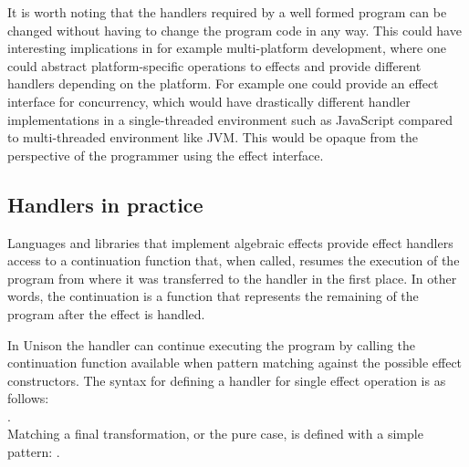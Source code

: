 It is worth noting that the handlers required by a well formed program can be changed without having to change the program code in any way. This could have interesting implications in for example multi-platform development, where one could abstract platform-specific operations to effects and provide different handlers depending on the platform. For example one could provide an effect interface for concurrency, which would have drastically different handler implementations in a single-threaded environment such as JavaScript compared to multi-threaded environment like JVM. This would be opaque from the perspective of the programmer using the effect interface.


\subsection{Handlers in practice}
Languages and libraries that implement algebraic effects provide effect handlers access to a continuation function that,  when called, resumes the execution of the program from where it was transferred to the handler in the first place. In other words, the continuation is a function that represents the remaining of the program after the effect is handled.


In Unison the handler can continue executing the program by calling the continuation function available when pattern matching against the possible effect constructors. The syntax for defining a handler for single effect operation is as follows: \\.\\ Matching a final transformation, or the pure case, is defined with a simple pattern:
.


